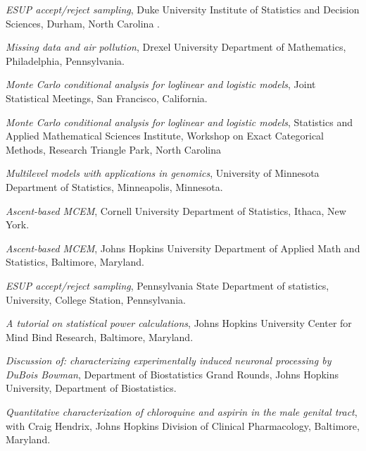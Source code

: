 \documentclass[12pt]{article}
\begin{document}
\begin{description}
\begin{description}
        \item {\it ESUP accept/reject sampling}, Duke University Institute of Statistics and Decision Sciences, Durham, North Carolina .
        \item {\it Missing data and air pollution}, Drexel University Department of Mathematics, Philadelphia, Pennsylvania.
        \item {\it Monte Carlo conditional analysis for loglinear and logistic models}, Joint Statistical Meetings, San Francisco, California.
        \item {\it Monte Carlo conditional analysis for loglinear and logistic models}, Statistics and Applied Mathematical Sciences Institute, Workshop on Exact Categorical Methods, Research Triangle Park, North Carolina
    \end{description}
    \item[\textnormal{2004}]
    \begin{description}
        \item {\it Multilevel models with applications in genomics}, University of Minnesota Department of Statistics, Minneapolis, Minnesota.
        \item {\it Ascent-based MCEM}, Cornell University Department of Statistics, Ithaca, New York.
    \end{description}
    \item[\textnormal{2005}]
    \begin{description}
        \item {\it Ascent-based MCEM}, Johns Hopkins University Department of Applied Math and Statistics, Baltimore, Maryland.
        \item {\it ESUP accept/reject sampling}, Pennsylvania State Department of statistics, University, College Station, Pennsylvania.
        \item {\it A tutorial on statistical power calculations}, Johns Hopkins University Center for Mind Bind Research, Baltimore, Maryland.
        \item {\it Discussion of: characterizing experimentally induced neuronal processing by DuBois Bowman}, Department of Biostatistics Grand Rounds, Johns Hopkins University, Department of Biostatistics.
        \item {\it Quantitative characterization of chloroquine and aspirin in the male genital tract}, with Craig Hendrix, Johns Hopkins Division of Clinical Pharmacology, Baltimore, Maryland.
    \end{description}
    \item[\textnormal{2006}]

\end{description}
\end{document}

